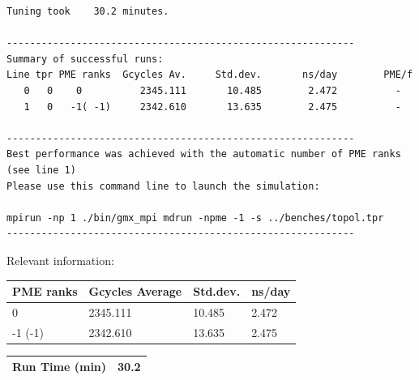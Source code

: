 \begin{lstlisting}[frame=single]
Tuning took    30.2 minutes.

------------------------------------------------------------
Summary of successful runs:
Line tpr PME ranks  Gcycles Av.     Std.dev.       ns/day        PME/f
   0   0    0          2345.111       10.485        2.472          -  
   1   0   -1( -1)     2342.610       13.635        2.475          -  

------------------------------------------------------------
Best performance was achieved with the automatic number of PME ranks (see line 1)
Please use this command line to launch the simulation:

mpirun -np 1 ./bin/gmx_mpi mdrun -npme -1 -s ../benches/topol.tpr  
------------------------------------------------------------

\end{lstlisting}

Relevant information:
\begin{center}
    \begin{tabular}{|p{3.5cm}|p{3.5cm}|p{3.5cm}|p{3.5cm}|} \hline
         PME ranks & Gcycles Average & Std.dev. & ns/day \\ \hline
         0 & 2345.111  & 10.485  & 2.472  \\ \hline
         -1 (-1) & 2342.610 & 13.635 & 2.475  \\ \hline
    \end{tabular}
    \begin{tabular}{|p{3.5cm}|p{11.4cm}|} \hline
         Run Time (min) & 30.2 \\ \hline
    \end{tabular}
\end{center}

